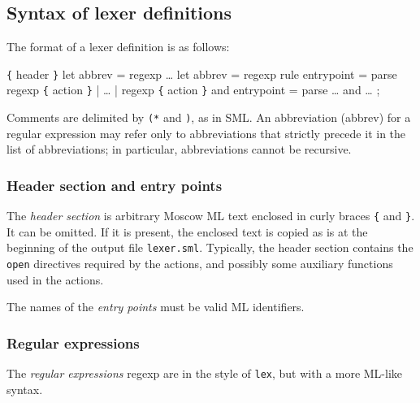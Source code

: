 \documentclass[fleqn,a4paper]{article}
\begin{document}
\subsection{Syntax of lexer definitions}

The format of a lexer definition is as follows:

\begin{program}
\verb#{# {\rm header} \verb#}#
let {\rm abbrev} = {\rm regexp}
\ldots
let {\rm abbrev} = {\rm regexp}
rule {\rm entrypoint} =
  parse {\rm regexp} \verb#{# {\rm action} \verb#}#
      | \ldots
      | {\rm regexp} \verb#{# {\rm action} \verb#}#
and {\rm entrypoint} =
  parse \ldots
and \ldots
;
\end{program}

\noindent Comments are delimited by {\tt (*} and {\tt *)}, as in
SML\@.  An abbreviation (abbrev) for a regular expression may refer
only to abbreviations that strictly precede it in the list of
abbreviations; in particular, abbreviations cannot be recursive.


\subsubsection{Header section and entry points}

The \emph{header section} is arbitrary Moscow ML text enclosed in curly
braces \verb#{# and \verb#}#.  It can be omitted.  If it is present,
the enclosed text is copied as is at the beginning of the output file
{\tt lexer.sml}.  Typically, the header section contains the {\tt
  open} directives required by the actions, and possibly some
auxiliary functions used in the actions.

The names of the \emph{entry points} must be valid ML identifiers.


\subsubsection{Regular expressions}

The \emph{regular expressions} regexp are in the style of {\tt lex},
but with a more ML-like syntax.
\end{document}
